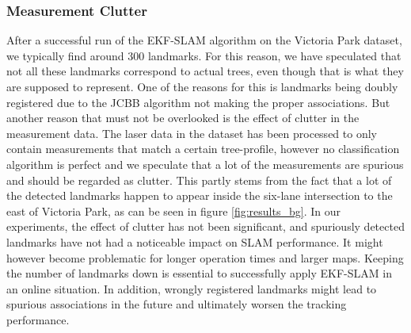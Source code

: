 \subsubsection{Measurement Clutter}
After a successful run of the EKF-SLAM algorithm on the Victoria Park dataset, we typically find around 300 landmarks. For this reason, we have speculated that not all these landmarks correspond to actual trees, even though that is what they are supposed to represent. One of the reasons for this is landmarks being doubly registered due to the JCBB algorithm not making the proper associations. But another reason that must not be overlooked is the effect of clutter in the measurement data. The laser data in the dataset has been processed to only contain measurements that match a certain tree-profile\cite{victoria}, however no classification algorithm is perfect and we speculate that a lot of the measurements are spurious and should be regarded as clutter. This partly stems from the fact that a lot of the detected landmarks happen to appear inside the six-lane intersection to the east of Victoria Park, as can be seen in figure \ref{fig:results_bg}. In our experiments, the effect of clutter has not been significant, and spuriously detected landmarks have not had a noticeable impact on SLAM performance. It might however become problematic for longer operation times and larger maps. Keeping the number of landmarks down is essential to successfully apply EKF-SLAM in an online situation. In addition, wrongly registered landmarks might lead to spurious associations in the future and ultimately worsen the tracking performance.

